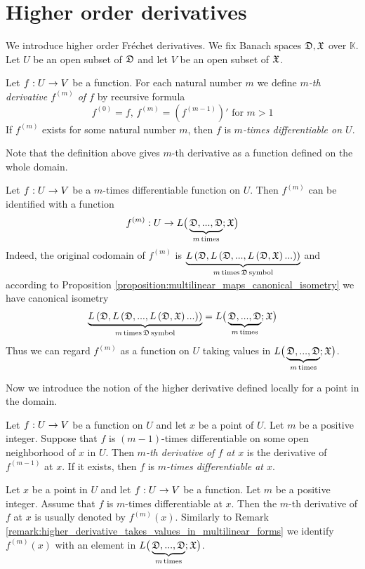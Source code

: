 \section{Higher order derivatives}
\noindent
We introduce higher order Fr{\'e}chet derivatives. We fix Banach spaces ${\mathfrak D},{\mathfrak X}$ over $\mathbb{K}$. Let $U$ be an open subset of ${\mathfrak D}$ and let $V$ be an open subset of ${\mathfrak X}$.

\begin{definition}
Let $f:U\rightarrow V$ be a function. For each natural number $m$ we define \textit{$m$-th derivative $f^{(m)}$ of $f$} by recursive formula
$$f^{(0)} = f,\,f^{(m)} = \left(f^{(m-1)}\right)'\mbox{ for }m>1$$
If $f^{(m)}$ exists for some natural number $m$, then $f$ is \textit{$m$-times differentiable on $U$}.
\end{definition}
\noindent
Note that the definition above gives $m$-th derivative as a function defined on the whole domain.

\begin{remark}\label{remark:higher_derivative_takes_values_in_multilinear_forms}
Let $f:U\rightarrow V$ be a $m$-times differentiable function on $U$. Then $f^{(m)}$ can be identified with a function
$$f^{(m)}:U\rightarrow L\big(\underbrace{{\mathfrak D},...,{\mathfrak D}}_{m\,\mathrm{times}};{\mathfrak X}\big)$$
Indeed, the original codomain of $f^{(m)}$ is $\underbrace{L\left({\mathfrak D},L\left({\mathfrak D},...,L\left({\mathfrak D},{\mathfrak X}\right)...\right)\right)}_{m\,\mathrm{times}\,{\mathfrak D}\,\mathrm{symbol}}$ and according to Proposition \ref{proposition:multilinear_maps_canonical_isometry} we have canonical isometry
$$\underbrace{L\left({\mathfrak D},L\left({\mathfrak D},...,L\left({\mathfrak D},{\mathfrak X}\right)...\right)\right)}_{m\,\mathrm{times}\,{\mathfrak D}\,\mathrm{symbol}} = L\big(\underbrace{{\mathfrak D},...,{\mathfrak D}}_{m\,\mathrm{times}};{\mathfrak X}\big)$$
Thus we can regard $f^{(m)}$ as a function on $U$ taking values in $L\big(\underbrace{{\mathfrak D},...,{\mathfrak D}}_{m\,\mathrm{times}};{\mathfrak X}\big)$.
\end{remark}
\noindent
Now we introduce the notion of the higher derivative defined locally for a point in the domain.

\begin{definition}
Let $f:U\rightarrow V$ be a function on $U$ and let $x$ be a point of $U$. Let $m$ be a positive integer. Suppose that $f$ is $(m-1)$-times differentiable on some open neighborhood of $x$ in $U$. Then \textit{$m$-th derivative of $f$ at $x$} is the derivative of $f^{(m-1)}$ at $x$. If it exists, then $f$ is \textit{$m$-times differentiable at $x$}.
\end{definition}

\begin{remark}\label{remark:higher_order_derivative_notation}
Let $x$ be a point in $U$ and let $f:U\rightarrow V$ be a function. Let $m$ be a positive integer. Assume that $f$ is $m$-times differentiable at $x$. Then the $m$-th derivative of $f$ at $x$ is usually denoted by $f^{(m)}(x)$. Similarly to Remark \ref{remark:higher_derivative_takes_values_in_multilinear_forms} we identify $f^{(m)}(x)$ with an element in $L\big(\underbrace{{\mathfrak D},...,{\mathfrak D}}_{m\,\mathrm{times}};{\mathfrak X}\big)$.
\end{remark}

